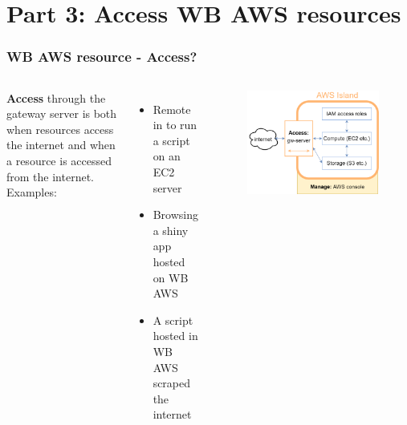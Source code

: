 \documentclass[aspectratio=169]{beamer} %
\begin{document}
\section{Part 3: Access WB AWS resources}

\begin{frame}
	\frametitle{WB AWS resource - Access?}
	\begin{columns}[c]
		\textbf{Access} through the gateway server is both
		when resources access the internet and
		when a resource is accessed from the internet.
		\vspace{.5cm}\newline
		Examples:
		\begin{itemize}
			\item Remote in to run a script on an EC2 server
			\item Browsing a shiny app hosted on WB AWS
			\item A script hosted in WB AWS scraped the internet
		\end{itemize}

		\begin{figure}
			\centering
			\includegraphics[width=\textwidth]{./img/wb-aws.png}
		\end{figure}

	\end{columns}
\end{frame}
\end{document}

